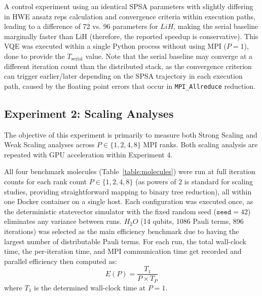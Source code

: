 
A control experiment using an identical SPSA parameters with slightly differing in HWE ansatz reps calculation and convergence criteria within execution paths, leading to a difference of 72 vs. 96 parameters for $LiH$, making the serial baseline marginally faster than LiH (therefore, the reported speedup is conservative). 
This VQE was executed within a single Python process without using MPI ($P=1$), done to provide the $T_{\text{serial}}$ value. 
Note that the serial baseline may converge at a different iteration count than the distributed stack, as the convergence criterion can trigger earlier/later depending on the SPSA trajectory in each execution path, caused by the floating point errors that occur 
in \texttt{MPI\_Allreduce} reduction. 

\subsection{Experiment 2: Scaling Analyses}
The objective of this experiment is primarily to measure both Strong Scaling and Weak Scaling analyses across  $P \in \{1,2,4,8\}$ MPI ranks. 
Both scaling analysis are repeated with GPU acceleration within Experiment 4.

All four benchmark molecules (Table~\ref{table:molecules}) were run at full iteration counts for each rank 
count $P \in \{1,2,4,8\}$ (as powers of 2 is standard for scaling studies, providing straightforward mapping to binary tree reduction), all within one Docker container on a single host. 
Each configuration was executed once, as the deterministic statevector simulator with the fixed 
random seed ($\texttt{seed}=42$) eliminates any variance between runs. $H_{2}O$ (14 qubits, 1086 Pauli terms, 896 iterations) was selected as the main 
efficiency benchmark due to having the largest number of distributable Pauli terms. For each run, the total 
wall-clock time, the per-iteration time, and MPI communication time get recorded and parallel efficiency then computed as:
\begin{equation}
    E(P) = \frac{T_1}{P \times T_P}
\end{equation}
where $T_1$ is the determined wall-clock time at $P= 1$.

